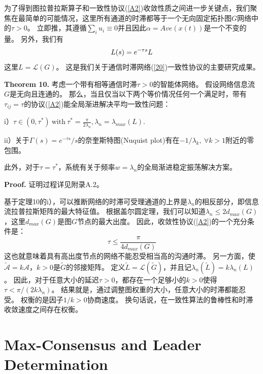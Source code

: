 \documentclass{article}
\begin{document}
为了得到图拉普拉斯算子和一致性协议(\ref{A2})收敛性质之间进一步关键点，我们聚焦在最简单的可能情况，这里所有通道的时滞都等于一个无向固定拓扑图$G$网络中的$\tau > 0$。
立即推，其遵循$\sum_i u_i \equiv 0$并且因此$\alpha = Ave(x(t))$是一个不变的量。
另外，我们有
\begin{equation}
    L(s) = e^{-\tau s}L
    \notag
\end{equation}
这里$L=\mathcal{L}(G)$。
这是我们关于通信时滞网络(\ref{20})一致性协议的主要研究成果。

\noindent \textbf{Theorem 10.} 考虑一个带有相等通信时滞$\tau > 0$的智能体网络。
假设网络信息流$G$是无向且连通的。
那么，当且仅当以下两个等价情况任何一个满足时，带有$\tau_{ij} = \tau$的协议(\ref{A2})能全局渐进解决平均一致性问题：

i）$\tau \in (0, \tau^*)\ \text{with}\ \tau^*=\frac{\pi}{2\lambda_n}, \lambda_n=\lambda_{max}(L)$.

ii）关于$\Gamma(s) = e^{-\tau s}/s$的奈奎斯特图(Nuquist plot)有在$-1/\lambda_k,\ \forall k > 1$附近的零包围。

此外，对于$\tau=\tau^*$，系统有关于频率$w=\lambda_n$的全局渐进稳定振荡解决方案。

\noindent \textbf{Proof.} 证明过程详见附录A.2。

基于定理10的i），可以推断网络的时滞可受理通道的上界是$\lambda_n$的相反部分，即信息流拉普拉斯矩阵的最大特征值。
根据盖尔圆定理，我们可以知道$\lambda_n\le 2d_{max}(G)$，这里$d_{max}(G)$是图$G$节点的最大出度。
因此，收敛性协议(\ref{A2})的一个充分条件是：
\begin{equation}
    \tau \le \frac{\pi}{4d_{max}(G)}
    \tag{40}
    \label{40}
\end{equation}
这也就意味着具有高出度节点的网络不能忍受相当高的沟通时滞。
另一方面，使$\tilde{\mathcal{A}}=k\mathcal{A}$，$k>0$是$\tilde{G}$的邻接矩阵。
定义$\tilde{L}=\mathcal{L}(\tilde{G})$，并且记$\lambda_n(\tilde{L}) = k\lambda_n(L)$。
因此，对于任意大小的延迟$\tau>0$，都存在一个足够小的$k>0$使得$\tau < \pi/(2k\lambda_n)$。
结果就是，通过调整图权重的大小，任意大小的时滞都能忍受。
权衡的是因子$1/k>0$协商速度。
换句话说，在一致性算法的鲁棒性和时滞收敛速度之间存在权衡。




\section{Max-Consensus and Leader Determination}
\end{document}
